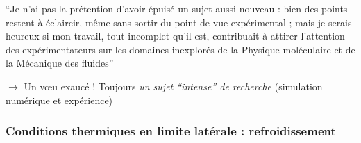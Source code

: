 \begin{frame}[fragile]
\begin{tiny}
\begin{remark}[H. Bénard (1900)]
``Je n’ai pas la prétention d’avoir épuisé un sujet aussi nouveau : bien des points restent à éclaircir, même sans sortir du point de vue expérimental ; mais je serais heureux si mon travail, tout incomplet qu’il est, contribuait à attirer l’attention des expérimentateurs sur les domaines inexplorés de la Physique moléculaire et de la Mécanique des fluides''
\end{remark}
\end{tiny}
\baselineskip 
\scriptsize $\rightarrow$ Un v\oe u exaucé ! Toujours \emph{un sujet ``intense'' de recherche} (simulation numérique et expérience)
\end{frame}
\subsubsection{Conditions thermiques en limite latérale : refroidissement}
